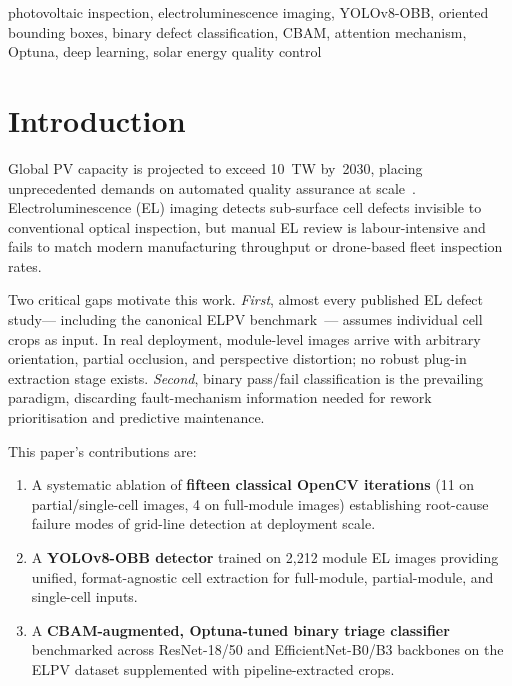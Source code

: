 \documentclass[conference]{IEEEtran}
\begin{document}
\begin{IEEEkeywords}
photovoltaic inspection, electroluminescence imaging,
YOLOv8-OBB, oriented bounding boxes, binary defect
classification, CBAM, attention mechanism, Optuna,
deep learning, solar energy quality control
\end{IEEEkeywords}

\section{Introduction}

Global PV capacity is projected to exceed 10~TW by~2030,
placing unprecedented demands on automated quality assurance
at scale~\cite{iea2023}. Electroluminescence (EL) imaging
detects sub-surface cell defects invisible to conventional
optical inspection, but manual EL review is labour-intensive
and fails to match modern manufacturing throughput or
drone-based fleet inspection rates.

Two critical gaps motivate this work.
\textit{First}, almost every published EL defect study---
including the canonical ELPV benchmark~\cite{deitsch2019}---
assumes individual cell crops as input. In real deployment,
module-level images arrive with arbitrary orientation, partial
occlusion, and perspective distortion; no robust plug-in
extraction stage exists.
\textit{Second}, binary pass/fail classification is the prevailing
paradigm, discarding fault-mechanism information needed for
rework prioritisation and predictive maintenance.

This paper's contributions are:
\begin{enumerate}
  \item A systematic ablation of \textbf{fifteen classical
        OpenCV iterations} (11 on partial/single-cell images,
        4 on full-module images) establishing root-cause
        failure modes of grid-line detection at deployment scale.
  \item A \textbf{YOLOv8-OBB detector} trained on 2{,}212
        module EL images providing unified, format-agnostic
        cell extraction for full-module, partial-module, and
        single-cell inputs.
  \item A \textbf{CBAM-augmented, Optuna-tuned binary triage
        classifier} benchmarked across ResNet-18/50 and
        EfficientNet-B0/B3 backbones on the ELPV dataset
        supplemented with pipeline-extracted crops.
\end{enumerate}
\end{document}
